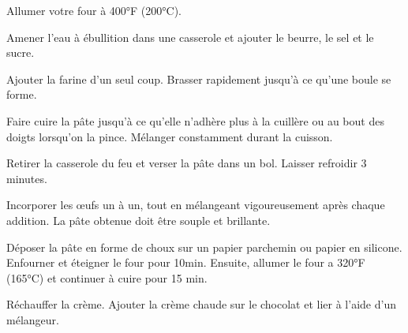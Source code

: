 \begin{steps}
    \item[] 
    \item Allumer votre four à 400°F (200°C).
    \item Amener l'eau à ébullition dans une casserole et ajouter le beurre, le sel et le sucre.
    \item Ajouter la farine d'un seul coup. Brasser rapidement jusqu'à ce qu'une boule se forme.
    \item Faire cuire la pâte jusqu'à ce qu'elle n'adhère plus à la cuillère ou au bout des doigts lorsqu'on la pince. Mélanger constamment durant la cuisson.
    \item Retirer la casserole du feu et verser la pâte dans un bol. Laisser refroidir 3 minutes.
    \item Incorporer les œufs un à un, tout en mélangeant vigoureusement après chaque addition. La pâte obtenue doit être souple et brillante.
    \item Déposer la pâte en forme de choux sur un papier parchemin ou papier en silicone. Enfourner et éteigner le four pour 10min. Ensuite, allumer le four a 320°F (165°C) et continuer à cuire pour 15 min.
    \\
    \item[] 
    \item Réchauffer la crème. Ajouter la crème chaude sur le chocolat et lier à l'aide d'un mélangeur.
\end{steps}
